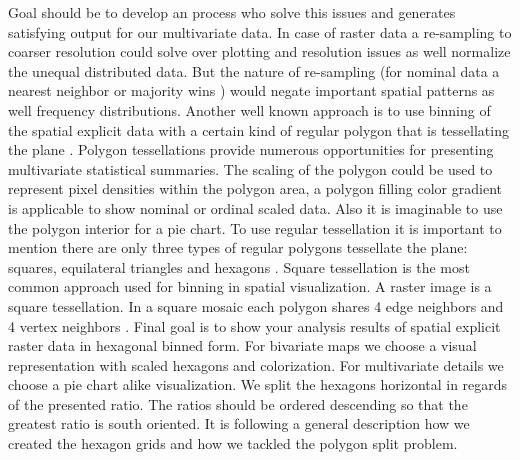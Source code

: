 		Goal should be to develop an process who solve this issues and generates satisfying output for our multivariate data. In case of raster data a re-sampling to coarser resolution could solve over plotting and resolution issues as well normalize the unequal distributed data. But the nature of re-sampling (for nominal data a nearest neighbor or majority wins ) would negate important spatial patterns as well frequency distributions. Another well known approach is to use binning of the spatial explicit data with a certain kind of regular polygon that is tessellating the plane \citep{Carr1992}. Polygon tessellations provide numerous opportunities for presenting multivariate statistical summaries. The scaling of the polygon could be used to represent pixel densities within the polygon area, a polygon filling color gradient is applicable to show nominal or ordinal scaled data. Also it is imaginable to use the polygon interior for a pie chart. To use regular tessellation it is important to mention there are only three types of regular polygons tessellate the plane: squares, equilateral triangles and hexagons \citep{Carr1992}. Square tessellation is the most common approach used for binning in spatial visualization. A raster image is a square tessellation. In a square mosaic each polygon shares 4 edge neighbors and 4 vertex neighbors . Final goal is to show your analysis results of spatial explicit raster data in hexagonal binned form. For bivariate maps we choose a visual representation with scaled hexagons and colorization. For multivariate details we choose a pie chart alike visualization. We split the hexagons horizontal in regards of the presented ratio. The ratios should be ordered descending so that the greatest ratio is south oriented. It is following a general description how we created the hexagon grids and how we tackled the polygon split problem. 

